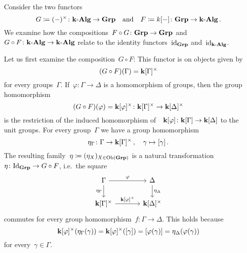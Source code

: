 \begin{example}
  Consider the two functors
  \[
              G
    \coloneqq  (-)^\times
    \colon    \text{$\mathbf{k}$-$\mathbf{Alg}$}
    \to       \mathbf{Grp}
    \quad\text{and}\quad
              F
    \coloneqq  k[-]
    \colon    \mathbf{Grp}
    \to       \text{$\mathbf{k}$-$\mathbf{Alg}$} \,.
  \]
  We examine how the compositions~$F \circ G \colon \mathbf{Grp} \to \mathbf{Grp}$ and~$G \circ F \colon \text{$\mathbf{k}$-$\mathbf{Alg}$} \to \text{$\mathbf{k}$-$\mathbf{Alg}$}$ relate to the identity functors~$\operatorname{id}_{\mathbf{Grp}}$ and~$\operatorname{id}_{\text{$\mathbf{k}$-$\mathbf{Alg}$}}$.
  
  Let us first examine the composition~$G \circ F$:
  This functor is on objects given by
  \[
      (G \circ F)(\Gamma)
    = \mathbf{k}[\Gamma]^\times
  \]
  for every groups~$\Gamma$.
  If~$\varphi \colon \Gamma \to \Delta$ is a homomorphism of groups, then the group homomorphism
  \[
            (G \circ F)(\varphi)
    =       \mathbf{k}[\varphi]^\times
    \colon  \mathbf{k}[\Gamma]^\times
    \to     \mathbf{k}[\Delta]^\times
  \]
  is the restriction of the induced homomorphism of~{\kalgs}~$\mathbf{k}[\varphi] \colon \mathbf{k}[\Gamma] \to \mathbf{k}[\Delta]$ to the unit groups.
  For every group~$\Gamma$ we have a group homomorphism
  \[
            \eta_\Gamma
    \colon  \Gamma
    \to     \mathbf{k}[\Gamma]^\times \,,
    \quad   \gamma
    \mapsto [\gamma] \,.
  \]
  The resulting family~$\eta \coloneqq (\eta_X)_{X \in \operatorname{Ob}(\mathbf{Grp})}$ is a natural transformation~$\eta \colon \mathrm{Id}_{\mathbf{Grp}} \to G \circ F$, i.e.\ the square
  \[
    \begin{tikzcd}[column sep = large]
        \Gamma
        \arrow{r}[above]{\varphi}
        \arrow{d}[left]{\eta_\Gamma}
      & \Delta
        \arrow{d}[right]{\eta_\Delta}
      \\
        \kf[\Gamma]^\times
        \arrow{r}[above]{\kf[\varphi]^\times}
      & \kf[\Delta]^\times
    \end{tikzcd}
  \]
  commutes for every group homomorphism~$f \colon \Gamma \to \Delta$.
  This holds because
  \[
      \mathbf{k}[\varphi]^\times( \eta_\Gamma( \gamma ) )
    = \mathbf{k}[\varphi]^\times( [\gamma] )
    = [\varphi(\gamma)]
    = \eta_\Delta( \varphi( \gamma ) )
  \]
  for every~$\gamma \in \Gamma$.
  

\end{example}
